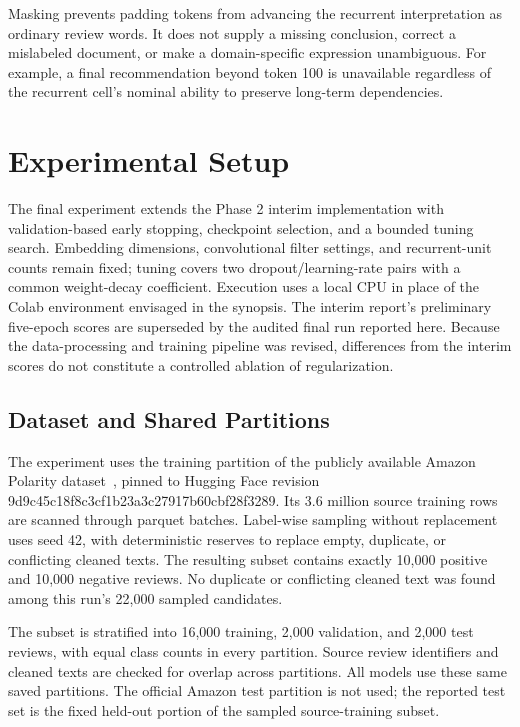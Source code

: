 Masking prevents padding tokens from advancing the recurrent interpretation as ordinary review words. It does not supply a missing conclusion, correct a mislabeled document, or make a domain-specific expression unambiguous. For example, a final recommendation beyond token 100 is unavailable regardless of the recurrent cell's nominal ability to preserve long-term dependencies.


\section{Experimental Setup}\label{sec:setup}
The final experiment extends the Phase 2 interim implementation with validation-based early stopping, checkpoint selection, and a bounded tuning search. Embedding dimensions, convolutional filter settings, and recurrent-unit counts remain fixed; tuning covers two dropout/learning-rate pairs with a common weight-decay coefficient. Execution uses a local CPU in place of the Colab environment envisaged in the synopsis. The interim report's preliminary five-epoch scores are superseded by the audited final run reported here. Because the data-processing and training pipeline was revised, differences from the interim scores do not constitute a controlled ablation of regularization.

\subsection{Dataset and Shared Partitions}
The experiment uses the training partition of the publicly available Amazon Polarity dataset~\cite{zhang2015}, pinned to Hugging Face revision 9d9c45c18f8c3cf1b23a3c27917b60cbf28f3289. Its 3.6 million source training rows are scanned through parquet batches. Label-wise sampling without replacement uses seed 42, with deterministic reserves to replace empty, duplicate, or conflicting cleaned texts. The resulting subset contains exactly 10,000 positive and 10,000 negative reviews. No duplicate or conflicting cleaned text was found among this run's 22,000 sampled candidates.

The subset is stratified into 16,000 training, 2,000 validation, and 2,000 test reviews, with equal class counts in every partition. Source review identifiers and cleaned texts are checked for overlap across partitions. All models use these same saved partitions. The official Amazon test partition is not used; the reported test set is the fixed held-out portion of the sampled source-training subset.

